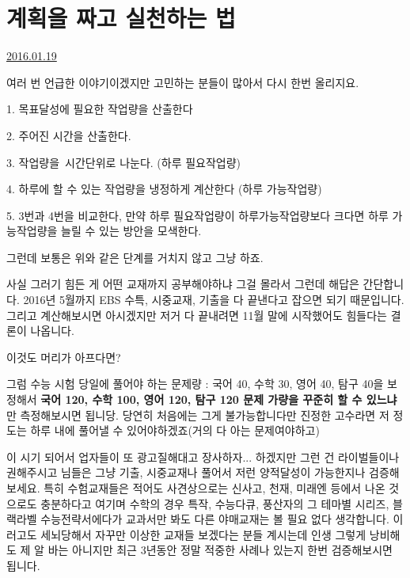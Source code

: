 \section{계획을 짜고 실천하는 법}
\href{https://www.kockoc.com/Apoc/596969}{2016.01.19}

\vspace{5mm}

여러 번 언급한 이야기이겠지만 고민하는 분들이 많아서 다시 한번 올리지요.
\vspace{5mm}

\item 1. 목표달성에 필요한 작업량을 산출한다
\item 2. 주어진 시간을 산출한다.
\item 3. 작업량을 시간단위로 나눈다. (하루 필요작업량)
\item 4. 하루에 할 수 있는 작업량을 냉정하게 계산한다 (하루 가능작업량)
\item 5. 3번과 4번을 비교한다, 만약 하루 필요작업량이 하루가능작업량보다 크다면 하루 가능작업량을 늘릴 수 있는 방안을 모색한다.
\vspace{5mm}

그런데 보통은 위와 같은 단계를 거치지 않고 그냥 하죠.
\vspace{5mm}

사실 그러기 힘든 게 어떤 교재까지 공부해야하냐 그걸 몰라서 그런데 해답은 간단합니다.
2016년 5월까지 EBS 수특, 시중교재, 기출을 다 끝낸다고 잡으면 되기 때문입니다.
그리고 계산해보시면 아시겠지만 저거 다 끝내려면 11월 말에 시작했어도 힘들다는 결론이 나옵니다.
\vspace{5mm}

이것도 머리가 아프다면?
\vspace{5mm}

그럼 수능 시험 당일에 풀어야 하는 문제량 : 국어 40, 수학 30, 영어 40, 탐구 40을 보정해서
\textbf{국어 120, 수학 100, 영어 120, 탐구 120 문제 가량을 꾸준히 할 수 있느냐}만 측정해보시면 됩니당.
당연히 처음에는 그게 불가능합니다만 진정한 고수라면 저 정도는 하루 내에 풀어낼 수 있어야하겠죠(거의 다 아는 문제여야하고)
\vspace{5mm}

이 시기 되어서 업자들이 또 광고질해대고 장사하자... 하겠지만
그런 건 라이벌들이나 권해주시고 님들은 그냥 기출, 시중교재나 풀어서 저런 양적달성이 가능한지나 검증해보세요.
특히 수험교재들은 적어도 사견상으로는 신사고, 천재, 미래엔 등에서 나온 것으로도 충분하다고 여기며
수학의 경우 특작, 수능다큐, 풍산자의 그 테마별 시리즈, 블랙라벨 수능전략서에다가 교과서만 봐도 다른 야매교재는 볼 필요 없다 생각합니다.
이러고도 세뇌당해서 자꾸만 이상한 교재들 보겠다는 분들 계시는데 인생 그렇게 낭비해도 제 알 바는 아니지만
최근 3년동안 정말 적중한 사례나 있는지 한번 검증해보시면 됩니다.
\vspace{5mm}

